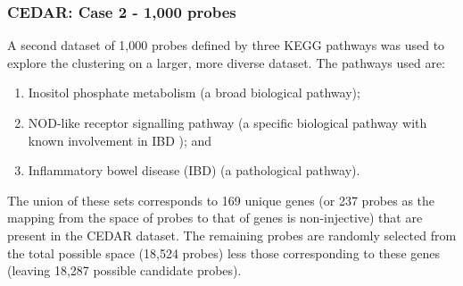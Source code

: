 \documentclass[12pt]{article} %
\begin{document}
	
	\subsubsection{CEDAR: Case 2 - 1,000 probes} \label{sec:case_studies:cedar:dataset_2}
	
	A second dataset of 1,000 probes defined by three KEGG pathways was used to explore the clustering on a larger, more diverse dataset. The pathways used are:
	
	\begin{enumerate} \label{list:kegg_pathways}
		\item Inositol phosphate metabolism (a broad biological pathway);
		\item NOD-like receptor signalling pathway (a specific biological pathway with known involvement in IBD \citep{CarneiroNodlikeproteinsinflammation2008, GarrettHomeostasisInflammationIntestine2010}); and
		\item Inflammatory bowel disease (IBD) (a pathological pathway).
	\end{enumerate}

	The union of these sets corresponds to 169 unique genes (or 237 probes as the mapping from the space of probes to that of genes is non-injective) that are present in the CEDAR dataset. The remaining probes are randomly selected from the total possible space (18,524 probes) less those corresponding to these genes (leaving 18,287 possible candidate probes).
\end{document}
